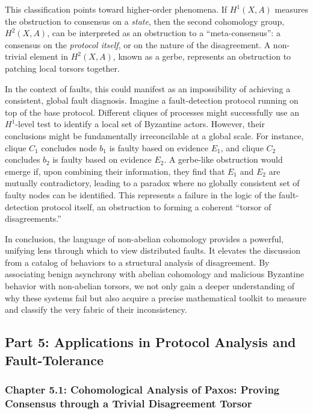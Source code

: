 \documentclass[
]{article}
\begin{document}
This classification points toward higher-order phenomena. If
\(H^1(X, A)\) measures the obstruction to consensus on a \emph{state},
then the second cohomology group, \(H^2(X, A)\), can be interpreted as
an obstruction to a ``meta-consensus'': a consensus on the
\emph{protocol itself}, or on the nature of the disagreement. A
non-trivial element in \(H^2(X, A)\), known as a gerbe, represents an
obstruction to patching local torsors together.

In the context of faults, this could manifest as an impossibility of
achieving a consistent, global fault diagnosis. Imagine a
fault-detection protocol running on top of the base protocol. Different
cliques of processes might successfully use an \(H^1\)-level test to
identify a local set of Byzantine actors. However, their conclusions
might be fundamentally irreconcilable at a global scale. For instance,
clique \(C_1\) concludes node \(b_1\) is faulty based on evidence
\(E_1\), and clique \(C_2\) concludes \(b_2\) is faulty based on
evidence \(E_2\). A gerbe-like obstruction would emerge if, upon
combining their information, they find that \(E_1\) and \(E_2\) are
mutually contradictory, leading to a paradox where no globally
consistent set of faulty nodes can be identified. This represents a
failure in the logic of the fault-detection protocol itself, an
obstruction to forming a coherent ``torsor of disagreements.''

In conclusion, the language of non-abelian cohomology provides a
powerful, unifying lens through which to view distributed faults. It
elevates the discussion from a catalog of behaviors to a structural
analysis of disagreement. By associating benign asynchrony with abelian
cohomology and malicious Byzantine behavior with non-abelian torsors, we
not only gain a deeper understanding of why these systems fail but also
acquire a precise mathematical toolkit to measure and classify the very
fabric of their inconsistency.

\subsection{Part 5: Applications in Protocol Analysis and
Fault-Tolerance}\label{part-5-applications-in-protocol-analysis-and-fault-tolerance}

\protect{}\label{part-5-Applications_in_Protocol_Analysis_and_Fa}{}

\subsubsection{Chapter 5.1: Cohomological Analysis of Paxos: Proving
Consensus through a Trivial Disagreement
Torsor}\label{chapter-5.1-cohomological-analysis-of-paxos-proving-consensus-through-a-trivial-disagreement-torsor}
\end{document}
